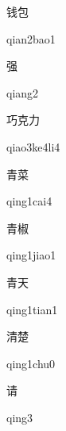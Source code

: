 \begin{multicols*}{2}
\begin{verbete}{钱包}
\begin{pronuncia}{qian2bao1}
\end{pronuncia}
\end{verbete}

\begin{verbete}[qiang2]{强}
\begin{pronuncia}{qiang2}
\end{pronuncia}
\end{verbete}

\begin{verbete}[qiao3ke4li4]{巧克力}
\begin{pronuncia}{qiao3ke4li4}
\end{pronuncia}
\end{verbete}

\begin{verbete}{青菜}
\begin{pronuncia}{qing1cai4}
\end{pronuncia}
\end{verbete}

\begin{verbete}{青椒}
\begin{pronuncia}{qing1jiao1}
\end{pronuncia}
\end{verbete}

\begin{verbete}{青天}
\begin{pronuncia}{qing1tian1}
\end{pronuncia}
\end{verbete}

\begin{verbete}{清楚}
\begin{pronuncia}{qing1chu0}
\end{pronuncia}
\end{verbete}

\begin{verbete}[qing3]{请}
\begin{pronuncia}{qing3}
\end{pronuncia}
\end{verbete}


\end{multicols*}
